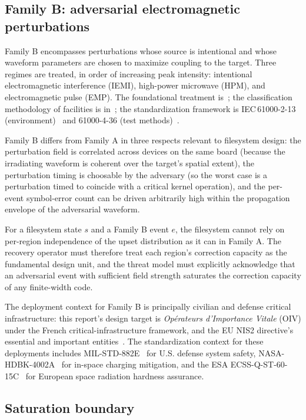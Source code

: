 \subsection{Family B: adversarial electromagnetic perturbations}

Family B encompasses perturbations whose source is intentional and
whose waveform parameters are chosen to maximize coupling to the
target. Three regimes are treated, in order of increasing peak
intensity: intentional electromagnetic interference (IEMI),
high-power microwave (HPM), and electromagnetic pulse (EMP). The
foundational treatment is~\cite{radasky2004iemi}; the
classification methodology of facilities is
in~\cite{mansson2008iemi}; the standardization framework is
IEC\,61000-2-13 (environment)~\cite{iec61000-2-13} and
61000-4-36 (test methods)~\cite{iec61000-4-36}.

Family B differs from Family A in three respects relevant to
filesystem design: the perturbation field is correlated across
devices on the same board (because the irradiating waveform is
coherent over the target's spatial extent), the perturbation
timing is choosable by the adversary (so the worst case is a
perturbation timed to coincide with a critical kernel
operation), and the per-event symbol-error count can be driven
arbitrarily high within the propagation envelope of the
adversarial waveform.

For a filesystem state \(s\) and a Family B event \(e\), the
filesystem cannot rely on per-region independence of the upset
distribution as it can in Family A. The recovery operator must
therefore treat each region's correction capacity as the
fundamental design unit, and the threat model must explicitly
acknowledge that an adversarial event with sufficient field
strength saturates the correction capacity of any finite-width
code.

The deployment context for Family B is principally civilian and
defense critical infrastructure: this report's design target is
\emph{Op\'erateurs d'Importance Vitale} (OIV) under the French
critical-infrastructure framework, and the EU NIS2 directive's
essential and important entities~\cite{nis2}. The standardization
context for these deployments includes
MIL-STD-882E~\cite{milstd882e} for U.S. defense system safety,
NASA-HDBK-4002A~\cite{nasa-hdbk-4002a} for in-space charging
mitigation, and the ESA ECSS-Q-ST-60-15C~\cite{esa-eccs60} for
European space radiation hardness assurance.

\subsection{Saturation boundary}

